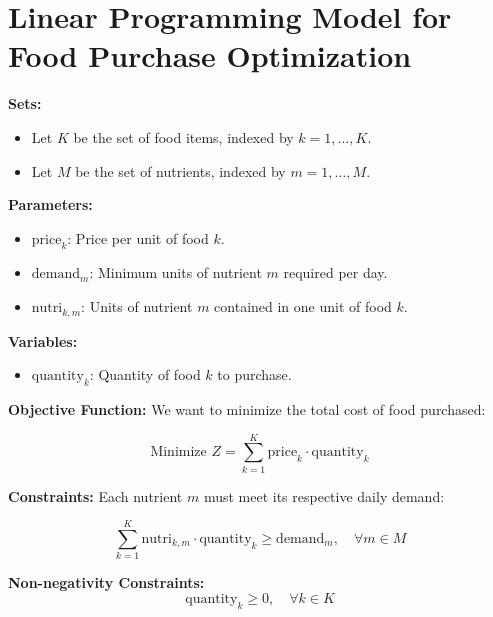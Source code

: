 \documentclass{article}
\begin{document}
\section*{Linear Programming Model for Food Purchase Optimization}

\textbf{Sets:}
\begin{itemize}
    \item Let \( K \) be the set of food items, indexed by \( k = 1, \ldots, K \).
    \item Let \( M \) be the set of nutrients, indexed by \( m = 1, \ldots, M \).
\end{itemize}

\textbf{Parameters:}
\begin{itemize}
    \item \( \text{price}_{k} \): Price per unit of food \( k \).
    \item \( \text{demand}_{m} \): Minimum units of nutrient \( m \) required per day.
    \item \( \text{nutri}_{k, m} \): Units of nutrient \( m \) contained in one unit of food \( k \).
\end{itemize}

\textbf{Variables:}
\begin{itemize}
    \item \( \text{quantity}_{k} \): Quantity of food \( k \) to purchase.
\end{itemize}

\textbf{Objective Function:}
We want to minimize the total cost of food purchased:

\[
\text{Minimize } Z = \sum_{k=1}^{K} \text{price}_{k} \cdot \text{quantity}_{k}
\]

\textbf{Constraints:}
Each nutrient \( m \) must meet its respective daily demand:

\[
\sum_{k=1}^{K} \text{nutri}_{k, m} \cdot \text{quantity}_{k} \geq \text{demand}_{m}, \quad \forall m \in M
\]

\textbf{Non-negativity Constraints:}
\[
\text{quantity}_{k} \geq 0, \quad \forall k \in K
\]
\end{document}

